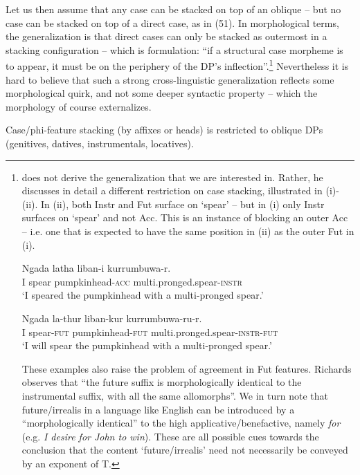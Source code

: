 \documentclass[output=paper]{langsci/langscibook}
\begin{document}
Let us then assume that any case can be stacked on top of an oblique – but no case can be stacked on top of a direct case, as in (51). In morphological terms, the generalization is that direct cases can only be stacked as outermost in a stacking configuration – which is  formulation: “if a structural case morpheme is to appear, it must be on the periphery of the DP’s inflection”.\footnote{\citet{Richards2013} does not derive the generalization that we are interested in. Rather, he discusses in detail a different restriction on case stacking, illustrated in (i)-(ii). In (ii), both Instr and Fut surface on ‘spear’ – but in (i) only Instr surfaces on ‘spear’ and not Acc. This is an instance of blocking an outer Acc – i.e. one that is expected to have the same position in (ii) as the outer Fut in (i).

\ea \gll    Ngada latha   liban-i       kurrumbuwa-r.\\
            I   spear   pumpkinhead-\textsc{acc}   multi.pronged.spear-\textsc{instr}\\
    \glt    ‘I speared the pumpkinhead with a multi-pronged spear.’\\
\z

\ea \gll    Ngada     la-thur     liban-kur     kurrumbuwa-ru-r.\\
            I     spear-\textsc{fut}   pumpkinhead-\textsc{fut}   multi.pronged.spear-\textsc{instr-fut}\\
    \glt    ‘I will spear the pumpkinhead with a multi-pronged spear.’\\
\z

These examples also raise the problem of agreement in Fut features. Richards observes that “the future suffix is morphologically identical to the instrumental suffix, with all the same allomorphs”. We in turn note that future\slash irrealis in a language like English can be introduced by a  “morphologically identical” to the high applicative\slash benefactive, namely \textit{for} (e.g. \textit{I desire for John to win}). These are all possible cues towards the conclusion that the content ‘future\slash irrealis’ need not necessarily be conveyed by an exponent of T.}  Nevertheless it is hard to believe that such a strong cross-linguistic generalization reflects some morphological quirk, and not some deeper syntactic property – which the morphology of course externalizes. 

\ea%
    \label{ex:manzini:51}
    Case/phi-feature stacking (by affixes or  heads) is restricted to oblique DPs (genitives, datives, instrumentals, locatives).  
    \z         
\end{document}
